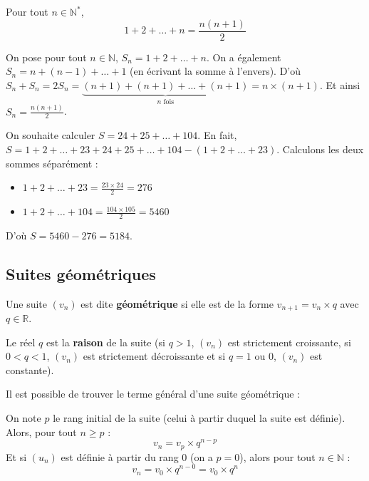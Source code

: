 	\begin{formula}
		Pour tout $n \in \mathbb{N}^*$,
		\[ 1 + 2 + \dots + n = \frac{n(n + 1)}{2} \]
	\end{formula}

	\begin{demonstration}
		On pose pour tout $n \in \mathbb{N}$, $S_n = 1 + 2 + \dots + n$. On a également $S_n = n + (n-1) + \dots + 1$ (en écrivant la somme à l'envers).
		\newline
		D'où $S_n + S_n = 2S_n = \underbrace{(n + 1) + (n + 1) + \dots + (n + 1)}_{n \text{ fois}} = n \times (n + 1)$. Et ainsi $S_n = \frac{n(n + 1)}{2}$.
	\end{demonstration}

	\begin{tip}[Exemple]
		On souhaite calculer $S = 24 + 25 + \dots + 104$.
		\newpar
		En fait, $S = 1 + 2 + \dots + 23 + 24 + 25 + \dots + 104 - (1 + 2 + \dots + 23)$. Calculons les deux sommes séparément :
		\begin{itemize}
			\item $1 + 2 + \dots + 23 = \frac{23 \times 24}{2} = 276$
			\item $1 + 2 + \dots + 104 = \frac{104 \times 105}{2} = 5460$
		\end{itemize}
		D'où $S = 5460 - 276 = 5184$.
	\end{tip}

	\subsection{Suites géométriques}

	\begin{formula}[Définition]
		Une suite $(v_n)$ est dite \textbf{géométrique} si elle est de la forme $v_{n+1} = v_n \times q$ avec $q \in \mathbb{R}$.
	\end{formula}

	\begin{formula}[Raison]
		Le réel $q$ est la \textbf{raison} de la suite (si $q > 1$, $(v_n)$ est strictement croissante, si $0 < q < 1$, $(v_n)$ est strictement décroissante et si $q = 1$ ou $0$, $(v_n)$ est constante).
	\end{formula}

	Il est possible de trouver le terme général d'une suite géométrique :

	\begin{formula}
		On note $p$ le rang initial de la suite (celui à partir duquel la suite est définie). Alors, pour tout $n \geq p$ :
		\[ v_n = v_p \times q^{n-p} \]
		Et si $(u_n)$ est définie à partir du rang $0$ (on a $p = 0$), alors pour tout $n \in \mathbb{N}$ :
		\[ v_n = v_0 \times q^{n-0} = v_0 \times q^n \]
	\end{formula}

